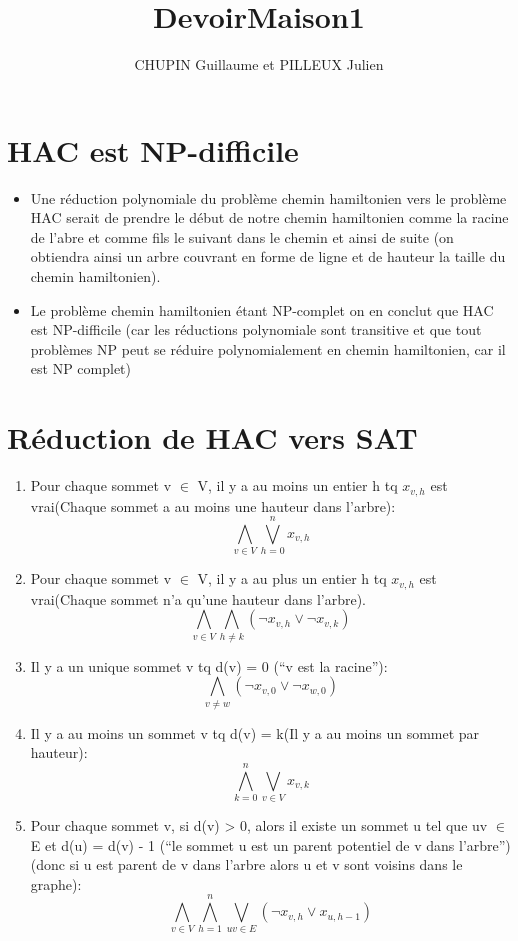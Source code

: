 \documentclass[10pt, a4paper]{article}
\title{DevoirMaison1}
\author {CHUPIN Guillaume et PILLEUX Julien}
\begin{document}
\maketitle
\thispagestyle {empty}
\newpage
\tableofcontents
\newpage

\section {HAC est NP-difficile}
\begin {itemize}
\item Une réduction polynomiale du problème chemin hamiltonien vers le problème HAC serait de prendre le début de notre chemin hamiltonien comme la racine de l'abre et comme fils le suivant dans le chemin et ainsi de suite (on obtiendra ainsi un arbre couvrant en forme de ligne et de hauteur la taille du chemin hamiltonien).
\item Le problème chemin hamiltonien étant NP-complet on en conclut que HAC est NP-difficile (car les réductions polynomiale sont transitive et que tout problèmes NP peut se réduire polynomialement en chemin hamiltonien, car il est NP complet)
\end {itemize}
\section {Réduction de HAC vers SAT}
\begin {enumerate}
\item Pour chaque sommet v $\in$ V, il y a au moins un entier h tq $x_{v,h}$ est vrai(Chaque sommet a au moins une hauteur dans l'arbre):
  \[
  \bigwedge_{v \in V}\bigvee_{h=0}^nx_{v,h}
  \]
\item  Pour chaque sommet v $\in$ V, il y a au plus un entier h tq $x_{v,h}$ est vrai(Chaque sommet n'a qu'une hauteur dans l'arbre).
  \[
  \bigwedge_{v\in V}\bigwedge_{h\neq k}(\neg x_{v,h} \vee \neg x_{v,k})
  \]
\item Il y a un unique sommet v tq d(v) = 0 (``v est la racine''):
  \[
  \bigwedge_{v\neq w}(\neg x_{v,0} \vee \neg x_{w,0})
  \]
\item Il y a au moins un sommet v tq d(v) = k(Il y a au moins un sommet par hauteur):
  \[
  \bigwedge_{k=0}^{n}\bigvee_{v\in V}x_{v,k}
  \]
\item Pour chaque sommet v, si d(v) > 0, alors il existe un sommet u tel que uv $\in$ E et d(u) = d(v) - 1 (``le sommet u est un parent potentiel de v dans l'arbre'')(donc si u est parent de v dans l'arbre alors u et v sont voisins dans le graphe):
  \[
  \bigwedge_{v\in V}\bigwedge_{h=1}^n\bigvee_{uv\in E}(\neg x_{v,h}\vee x_{u,h-1})
  \]
\end {enumerate}
\end{document}
